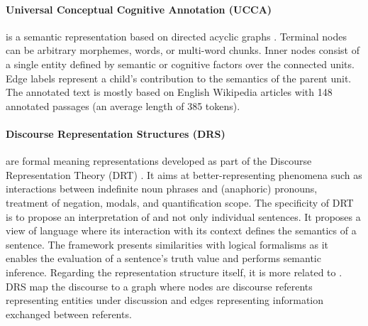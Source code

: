 

\paragraph{Universal Conceptual Cognitive Annotation (UCCA)} is a semantic representation based on directed acyclic graphs \parencite{abend2013universal}. Terminal nodes can be arbitrary morphemes, words, or multi-word chunks. Inner nodes consist of a single entity defined by semantic or cognitive factors over the connected units. Edge labels represent a child's contribution to the semantics of the parent unit. The annotated text is mostly based on English Wikipedia articles with 148 annotated passages  (an average length of 385 tokens).

\paragraph{Discourse Representation Structures (DRS)} are formal meaning representations developed as part of the Discourse Representation Theory (DRT) . It aims at better-representing phenomena such as interactions between indefinite noun phrases and (anaphoric) pronouns, treatment of negation, modals, and quantification scope. The specificity of DRT is to propose an interpretation of  and not only individual sentences. It proposes a view of language where its interaction with its context defines the semantics of a sentence. The framework presents similarities with logical formalisms as it enables the evaluation of a sentence's truth value and performs semantic inference. Regarding the representation structure itself, it is more related to . DRS map the discourse to a graph where nodes are discourse referents representing entities under discussion and edges representing information exchanged between referents.

